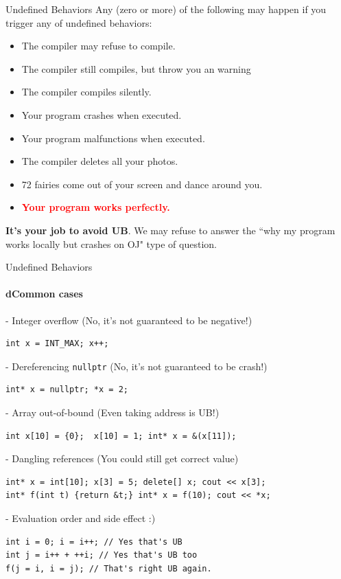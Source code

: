 \begin{frame}{Undefined Behaviors}
Any (zero or more) of the following may happen if you trigger any of undefined behaviors:

\begin{itemize}
	\item The compiler may refuse to compile.
	\item The compiler still compiles, but throw you an warning
	\item The compiler compiles silently.
	\item Your program crashes when executed.
	\item Your program malfunctions when executed.
	\item The compiler deletes all your photos.
	\item 72 fairies come out of your screen and dance around you.
	\item \textbf{\textcolor{red}{Your program works perfectly.}}
\end{itemize} 

\textbf{It's your job to avoid UB}. We may refuse to answer the ``why my program works locally but crashes on OJ" type of question.
\end{frame}

\begin{frame}[fragile]{Undefined Behaviors}
\framesubtitle{dCommon cases}


- Integer overflow (No, it's not guaranteed to be negative!)
\begin{verbatim}
int x = INT_MAX; x++; 
\end{verbatim}

- Dereferencing \texttt{nullptr} (No, it's not guaranteed to be crash!)
\begin{verbatim}
int* x = nullptr; *x = 2;
\end{verbatim}

- Array out-of-bound (Even taking address is UB!)
\begin{verbatim}
int x[10] = {0};  x[10] = 1; int* x = &(x[11]);
\end{verbatim}



- Dangling references (You could still get correct value)
\begin{verbatim}
int* x = int[10]; x[3] = 5; delete[] x; cout << x[3]; 
int* f(int t) {return &t;} int* x = f(10); cout << *x;
\end{verbatim}

- Evaluation order and side effect :)
\begin{verbatim}
int i = 0; i = i++; // Yes that's UB
int j = i++ + ++i; // Yes that's UB too
f(j = i, i = j); // That's right UB again.
\end{verbatim}

\end{frame}

